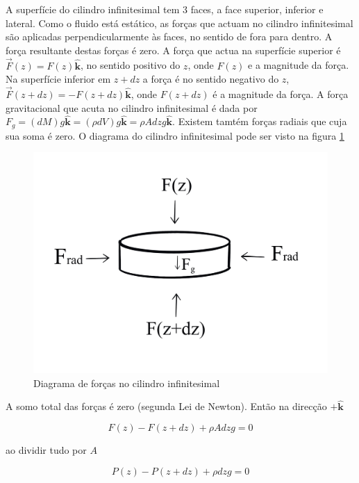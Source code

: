 \documentclass[
  portuguese,
  ]{book}
\begin{document}
A superfície do cilindro infinitesimal tem 3 faces, a face superior, inferior e lateral. Como o fluido está estático, as forças que actuam no cilindro infinitesimal são aplicadas perpendicularmente às faces, no sentido de fora para dentro. A força resultante destas forças é zero. A força que actua na superfície superior é \(\vec{F}(z)=F(z)\boldsymbol{\hat{k}}\), no sentido positivo do \(z\), onde \(F(z)\) e a magnitude da força. Na superfície inferior em \(z+dz\) a força é no sentido negativo do \(z\), \(\vec{F}(z+dz)=-F(z+dz)\boldsymbol{\hat{k}}\), onde \(F(z+dz)\) é a magnitude da força. A força gravitacional que acuta no cilindro infinitesimal é dada por \(F_g=(dM)g\boldsymbol{\hat{k}}=(\rho dV)g\boldsymbol{\hat{k}}=\rho Adzg\boldsymbol{\hat{k}}\). Existem tamtém forças radiais que cuja sua soma é zero. O diagrama do cilindro infinitesimal pode ser visto na figura \ref{fig:imghidros3}

\begin{figure}

{\centering \includegraphics[width=0.7\linewidth]{img/hidros_3} 

}

\caption{Diagrama de forças no cilindro infinitesimal}\label{fig:imghidros3}
\end{figure}

A somo total das forças é zero (segunda Lei de Newton). Então na direcção \(+\boldsymbol{\hat{k}}\)

\begin{equation}
F(z)-F(z+dz)+\rho Adzg=0
\label{eq:hidros6}
\end{equation}

ao dividir tudo por \(A\)

\begin{equation}
P(z)-P(z+dz)+\rho dzg=0
\label{eq:hidros7}
\end{equation}
\end{document}
